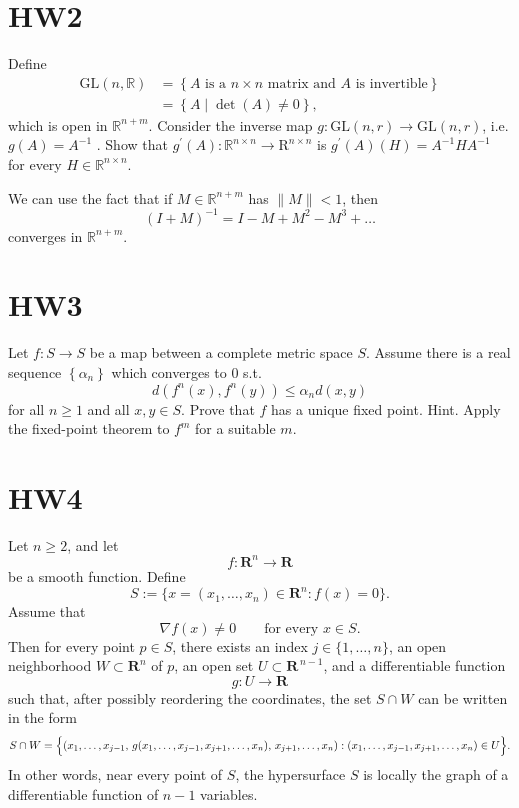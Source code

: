 \section{HW2}
\begin{problem}
    Define 
    \begin{align*}
        \mathrm{GL}(n, \mathbb{R}) &= \left\{ A \text{ is a } n\times n \text{ matrix and } A \text{ is invertible}    \right\} \\
        &= \left\{ A \mid \det (A) \neq 0 \right\},  
    \end{align*}
    which is open in \(\mathbb{R} ^{n + m}\). Consider the inverse map \(g: \mathrm{GL}(n, r) \to \mathrm{GL}(n, r)\), i.e. \(g(A) = A^{-1}\) . Show that \(g^{\prime} (A): \mathbb{R} ^{n \times n} \to \mathrm{R}^{n \times n} \) is \(g^{\prime} (A)(H) = A^{-1} H A^{-1}\) for every \(H \in \mathbb{R} ^{n \times n}\). 

    \begin{remark}
        We can use the fact that if \(M \in \mathbb{R} ^{n + m}\) has \(\lVert M \rVert < 1 \), then 
        \[
            (I + M)^{-1} = I - M + M^2 - M^3 + \dots 
        \]  
        converges in \(\mathbb{R} ^{n + m}\). 
    \end{remark}      
\end{problem}

\section{HW3}

\begin{problem}
    Let \(f: S \to S\) be a map between a complete metric space \(S\). Assume there is a real sequence \(\left\{ \alpha _n \right\} \) which converges to \(0\) s.t. 
    \[
        d(f^n(x), f^n(y)) \le \alpha _n d(x, y)
    \]    
    for all \(n \ge 1\) and all \(x, y \in S\). Prove that \(f\) has a unique fixed point. Hint. Apply the fixed-point theorem to \(f^m\) for a suitable \(m\).  
\end{problem}

\section{HW4}

\begin{problem}
    Let \(n\ge 2\), and let
\[
f:\mathbf{R}^n\to \mathbf{R}
\]
be a smooth function. Define
\[
S:=\{x=(x_1,\dots,x_n)\in \mathbf{R}^n : f(x)=0\}.
\]
Assume that
\[
\nabla f(x)\neq 0
\qquad\text{for every }x\in S.
\]
Then for every point \(p\in S\), there exists an index \(j\in\{1,\dots,n\}\), an open neighborhood
\(W\subset \mathbf{R}^n\) of \(p\), an open set \(U\subset \mathbf{R}^{\,n-1}\), and a differentiable
function
\[
g:U\to \mathbf{R}
\]
such that, after possibly reordering the coordinates, the set \(S\cap W\) can be written in the form
\[
S\cap W
=
\Bigl\{
(x_1,\dots,x_{j-1},\, g(x_1,\dots,x_{j-1},x_{j+1},\dots,x_n),\, x_{j+1},\dots,x_n)
:
(x_1,\dots,x_{j-1},x_{j+1},\dots,x_n)\in U
\Bigr\}.
\]
In other words, near every point of \(S\), the hypersurface \(S\) is locally the graph of a differentiable
function of \(n-1\) variables.
\end{problem}

